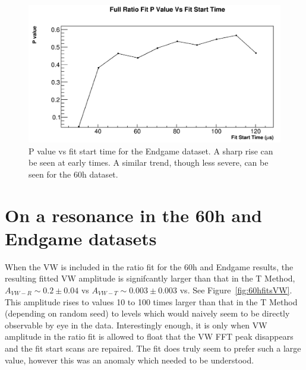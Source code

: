 \documentclass[12pt,letterpaper]{article}
\newcommand{\figref}[1]{Figure~\ref{#1}}
\begin{document}
\begin{figure}[]
    \centering
    \includegraphics[width=.7\textwidth]{Pvalue_Endgame}
    \caption[]{P value vs fit start time for the Endgame dataset. A sharp rise can be seen at early times. A similar trend, though less severe, can be seen for the 60h dataset.}
    \label{fig:Pvalue_Endgame}
\end{figure}



\section{On a resonance in the 60h and Endgame datasets}

When the VW is included in the ratio fit for the 60h and Endgame results, the resulting fitted VW amplitude is signifcantly larger than that in the T Method, $A_{VW-R} \sim 0.2 \pm 0.04$ vs $A_{VW-T} \sim 0.003 \pm 0.003$ vs. See \figref{fig:60hfitsVW}. This amplitude rises to values 10 to 100 times larger than that in the T Method (depending on random seed) to levels which would naively seem to be directly observable by eye in the data. Interestingly enough, it is only when VW amplitude in the ratio fit is allowed to float that the VW FFT peak disappears and the fit start scans are repaired. The fit does truly seem to prefer such a large value, however this was an anomaly which needed to be understood.
\end{document}
